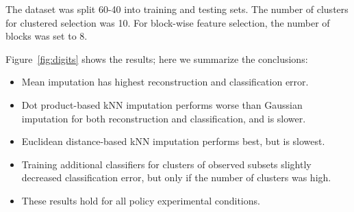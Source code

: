 The dataset was split 60-40 into training and testing sets.
The number of clusters for clustered selection was 10.
For block-wise feature selection, the number of blocks was set to 8.

Figure~\ref{fig:digits} shows the results; here we summarize the conclusions:

\begin{itemize}
\item Mean imputation has highest reconstruction and classification error.
\item Dot product-based kNN imputation performs worse than Gaussian imputation for both reconstruction and classification, and is slower.
\item Euclidean distance-based kNN imputation performs best, but is slowest.
\item Training additional classifiers for clusters of observed subsets slightly decreased classification error, but only if the number of clusters was high.
\item These results hold for all policy experimental conditions.
\end{itemize}

